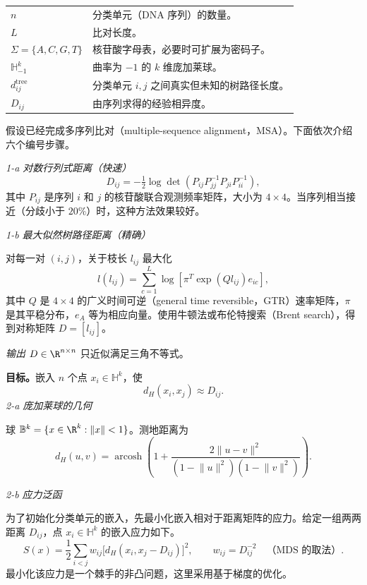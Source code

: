 \noindent\begin{tabularx}{\linewidth}{@{}l X@{}}
  $n$ & 分类单元（DNA 序列）的数量。\\
  $L$ & 比对长度。\\
  $\Sigma=\{A,C,G,T\}$ & 核苷酸字母表，必要时可扩展为密码子。\\
  $\mathbb H^k_{-1}$ & 曲率为 $-1$ 的 $k$ 维庞加莱球。\\
  $d^{\mathrm{tree}}_{ij}$ & 分类单元 $i,j$ 之间真实但未知的树路径长度。\\
  $D_{ij}$ & 由序列求得的经验相异度。
\end{tabularx}

假设已经完成多序列比对（multiple-sequence alignment，MSA）。下面依次介绍六个编号步骤。

\emph{1-a \quad 对数行列式距离（快速）}
\[
  D_{ij}=-\tfrac12\log\det(P_{ij}P_{jj}^{-1}P_{ji}P_{ii}^{-1}),
\]
其中 $P_{ij}$ 是序列 $i$ 和 $j$ 的核苷酸联合观测频率矩阵，大小为 $4\times4$。当序列相当接近（分歧小于 $20\%$）时，这种方法效果较好。

\emph{1-b \quad 最大似然树路径距离（精确）}

对每一对 $(i,j)$，关于枝长 $l_{ij}$ 最大化
\[
  l(l_{ij})=\sum_{c=1}^{L}\log\!\left[\pi^{T}\exp(Ql_{ij})e_{ic}\right],
\]
其中 $Q$ 是 $4\times4$ 的广义时间可逆（general time reversible，GTR）速率矩阵，$\pi$ 是其平稳分布，$e_A$ 等为相应向量。使用牛顿法或布伦特搜索（Brent search），得到对称矩阵 $D=[l_{ij}]$。

\emph{输出} $D\in\R^{n\times n}$ 只近似满足三角不等式。

\textbf{目标。}嵌入 $n$ 个点 $x_i\in\mathbb H^k$，使
\[
  d_H(x_i,x_j)\approx D_{ij}.
\]
\emph{2-a \quad 庞加莱球的几何}

球 $\mathbb B^k=\{x\in\R^k:\lVert x\rVert<1\}$。测地距离为
\[
  d_H(u,v)=\operatorname{arcosh}\!\left(
    1+\frac{2\lVert u-v\rVert^2}{(1-\lVert u\rVert^2)(1-\lVert v\rVert^2)}
  \right).
\]

\emph{2-b \quad 应力泛函}

为了初始化分类单元的嵌入，先最小化嵌入相对于距离矩阵的应力。给定一组两两距离 $D_{ij}$，点 $x_i\in\mathbb H^k$ 的嵌入应力如下。
\[
  S(x)=\frac12\sum_{i<j} w_{ij}\bigl[d_H(x_i,x_j-D_{ij})\bigr]^2,
  \qquad w_{ij}=D_{ij}^{-2}\quad\text{（MDS 的取法）}.
\]
最小化该应力是一个棘手的非凸问题，这里采用基于梯度的优化。

